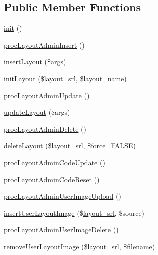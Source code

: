 \subsection*{Public Member Functions}
\begin{DoxyCompactItemize}
\item 
\hyperlink{classlayoutAdminController_ac71d304730d23b80b6c98f547d11226c}{init} ()
\item 
\hyperlink{classlayoutAdminController_aa80e244c2f02d0c46c6bee2f5921f4aa}{proc\-Layout\-Admin\-Insert} ()
\item 
\hyperlink{classlayoutAdminController_ada932b56411405c661fe90802921bc0c}{insert\-Layout} (\$args)
\item 
\hyperlink{classlayoutAdminController_ac98297f3c4d126154519bf9feb3a65f6}{init\-Layout} (\$\hyperlink{ko_8install_8php_a70054876db09b2519a1726663c8dd9e7}{layout\-\_\-srl}, \$layout\-\_\-name)
\item 
\hyperlink{classlayoutAdminController_a897057011913af6cb2740d8460544119}{proc\-Layout\-Admin\-Update} ()
\item 
\hyperlink{classlayoutAdminController_a7eec8ee6d2626ef89b08eb67af6638de}{update\-Layout} (\$args)
\item 
\hyperlink{classlayoutAdminController_a4a394a3902b03d0e7454f3b5047c1d5e}{proc\-Layout\-Admin\-Delete} ()
\item 
\hyperlink{classlayoutAdminController_a2e6e041059b08e3050ebf0f9fd0630bb}{delete\-Layout} (\$\hyperlink{ko_8install_8php_a70054876db09b2519a1726663c8dd9e7}{layout\-\_\-srl}, \$force=F\-A\-L\-S\-E)
\item 
\hyperlink{classlayoutAdminController_ac261704e4541f3696a37f4e080b059d2}{proc\-Layout\-Admin\-Code\-Update} ()
\item 
\hyperlink{classlayoutAdminController_a8e57e33b0b177381e53943d8e8230e71}{proc\-Layout\-Admin\-Code\-Reset} ()
\item 
\hyperlink{classlayoutAdminController_a8883afdc3e36df910ff5c950d94f5919}{proc\-Layout\-Admin\-User\-Image\-Upload} ()
\item 
\hyperlink{classlayoutAdminController_acf8d291755db711c0d6fe4209154a998}{insert\-User\-Layout\-Image} (\$\hyperlink{ko_8install_8php_a70054876db09b2519a1726663c8dd9e7}{layout\-\_\-srl}, \$source)
\item 
\hyperlink{classlayoutAdminController_a91dcd0368a7a3f85b2047d0d2546f14b}{proc\-Layout\-Admin\-User\-Image\-Delete} ()
\item 
\hyperlink{classlayoutAdminController_a57ce8eb7e45c237bc9f20b2a2b9576c0}{remove\-User\-Layout\-Image} (\$\hyperlink{ko_8install_8php_a70054876db09b2519a1726663c8dd9e7}{layout\-\_\-srl}, \$filename)

\end{DoxyCompactItemize}
